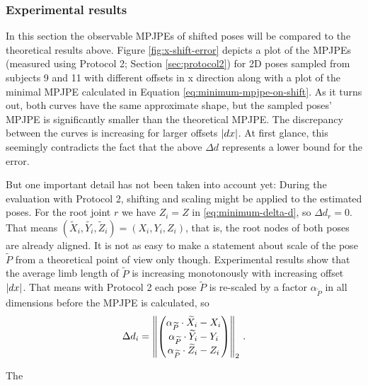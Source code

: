 
\subsubsection{Experimental results}

In this section the observable MPJPEs of shifted poses will be compared to the theoretical results above. 
Figure \ref{fig:x-shift-error} depicts a plot of the MPJPEs (measured using Protocol 2; Section \ref{sec:protocol2}) for 2D poses sampled from subjects 9 and 11 with different offsets in x direction along with a plot of the minimal MPJPE calculated in Equation \eqref{eq:minimum-mpjpe-on-shift}.
As it turns out, both curves have the same approximate shape, but the sampled poses' MPJPE is significantly smaller than the theoretical MPJPE.
The discrepancy between the curves is increasing for larger offsets $\abs{dx}$.
At first glance, this seemingly contradicts the fact that the above $\Delta d$ represents a lower bound for the error.

But one important detail has not been taken into account yet:
During the evaluation with Protocol 2, shifting and scaling might be applied to the estimated poses. 
For the root joint $r$ we have $Z_i = Z$ in \eqref{eq:minimum-delta-d}, so $\Delta d_r = 0$. That means $(\widetilde{X}_i, \widetilde{Y_i}, \widetilde{Z}_i) = (X_i, Y_i, Z_i)$, that is, the root nodes of both poses are already aligned.
It is not as easy to make a statement about scale of the pose $\widetilde{P}$ from a theoretical point of view only though.
Experimental results show that the average limb length of $\widetilde{P}$ is increasing monotonously with increasing offset $\abs{dx}$.
That means with Protocol 2 each pose $\widetilde{P}$ is re-scaled by a factor $\alpha_{\widetilde{P}}$ in all dimensions before the MPJPE is calculated, so
\begin{equation}
	\Delta d_i = \norm{ 
	\begin{pmatrix}
		\alpha_{\widetilde{P}} \cdot \widetilde{X}_i - X_i \\
		\alpha_{\widetilde{P}} \cdot \widetilde{Y}_i - Y_i \\
		\alpha_{\widetilde{P}} \cdot \widetilde{Z}_i - Z_i
	\end{pmatrix}
	}_2 \ .
\end{equation}

The 

